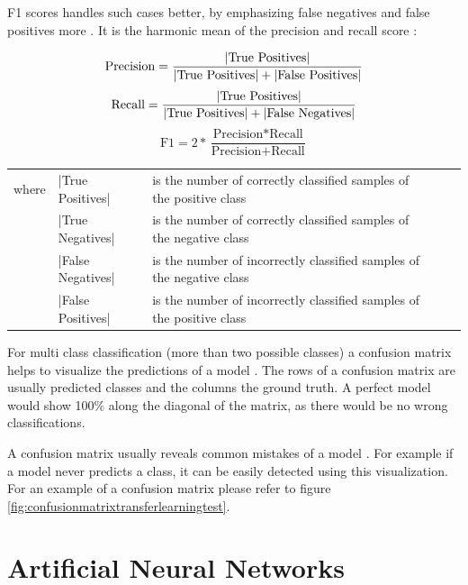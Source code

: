 \documentclass[draft,final,oneside]{vutinfth} %
\begin{document}
\pagebreak

F1 scores handles such cases better, by emphasizing false negatives and false positives more \cite{Powers2008EvaluationFP}. It is the harmonic mean of the precision and recall score \cite{Powers2008EvaluationFP}:

\begin{equation}
\text{Precision}=\frac{|\text{True Positives}|} {|\text{True Positives}| + |\text{False Positives}|}\\
\end{equation}
\begin{equation}
\text{Recall}=\frac{|\text{True Positives}|} {|\text{True Positives}| + |\text{False Negatives}|}\\
\end{equation}
\begin{equation}
\text{F1} = 2 * \frac{\text{Precision} * \text{Recall}}{\text{Precision} + \text{Recall}}
\end{equation}
\FloatBarrier
\begin{table}[h]
\begin{tabular}{lllll}
where & |True Positives| & is the number of correctly classified samples of the positive class \\
 & |True Negatives| & is the number of correctly classified samples of the negative class \\
 & |False Negatives| & is the number of incorrectly classified samples of the negative class \\
 & |False Positives| & is the number of incorrectly classified samples of the positive class 
\end{tabular}
\end{table}
\FloatBarrier
For multi class classification (more than two possible classes) a confusion matrix helps to visualize the predictions of a model \cite{accuracy}. The rows of a confusion matrix are usually predicted classes and the columns the ground truth. A perfect model would show 100\% along the diagonal of the matrix, as there would be no wrong classifications.

A confusion matrix usually reveals common mistakes of a model \cite{accuracy}. For example if a model never predicts a class, it can be easily detected using this visualization. For an example of a confusion matrix please refer to figure \ref{fig:confusionmatrixtransferlearningtest}.

\section{Artificial Neural Networks}
\end{document}
